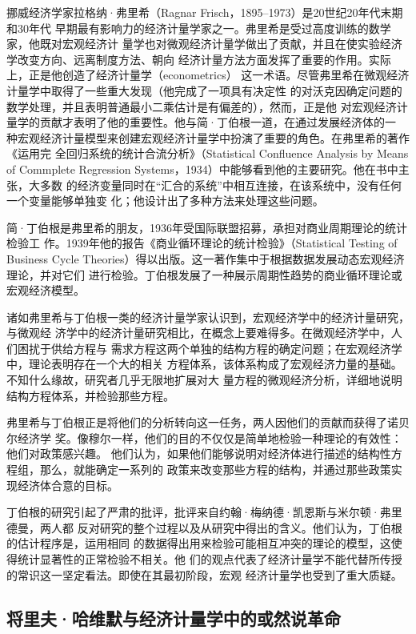 挪威经济学家拉格纳·弗里希（Ragnar Frisch，1895--1973）是20世纪20年代末期和30年代
早期最有影响力的经济计量学家之一。弗里希是受过高度训练的数学家，他既对宏观经济计
量学也对微观经济计量学做出了贡献，并且在使实验经济学改变方向、远离制度方法、朝向
经济计量方法方面发挥了重要的作用。实际上，正是他创造了经济计量学（econometrics）
这一术语。尽管弗里希在微观经济计量学中取得了一些重大发现（他完成了一项具有决定性
的对沃克因确定问题的数学处理，并且表明普通最小二乘估计是有偏差的），然而，正是他
对宏观经济计量学的贡献才表明了他的重要性。他与简·丁伯根一道，在通过发展经济体的一
种宏观经济计量模型来创建宏观经济计量学中扮演了重要的角色。在弗里希的著作《运用完
全回归系统的统计合流分析》（Statistical Confluence Analysis by Means of
Commplete Regression Systems，1934）中能够看到他的主要研究。他在书中主张，大多数
的经济变量同时在“汇合的系统”中相互连接，在该系统中，没有任何一个变量能够单独变
化；他设计出了多种方法来处理这些问题。

简·丁伯根是弗里希的朋友，1936年受国际联盟招募，承担对商业周期理论的统计检验工
作。1939年他的报告《商业循环理论的统计检验》（Statistical Testing of Business
Cycle Theories）得以出版。这一著作集中于根据数据发展动态宏观经济理论，并对它们
进行检验。丁伯根发展了一种展示周期性趋势的商业循环理论或宏观经济模型。

诸如弗里希与丁伯根一类的经济计量学家认识到，宏观经济学中的经济计量研究，与微观经
济学中的经济计量研究相比，在概念上要难得多。在微观经济学中，人们困扰于供给方程与
需求方程这两个单独的结构方程的确定问题；在宏观经济学中，理论表明存在一个大的相关
方程体系，该体系构成了宏观经济力量的基础。不知什么缘故，研究者几乎无限地扩展对大
量方程的微观经济分析，详细地说明结构方程体系，并检验那些方程。

弗里希与丁伯根正是将他们的分析转向这一任务，两人因他们的贡献而获得了诺贝尔经济学
奖。像穆尔一样，他们的目的不仅仅是简单地检验一种理论的有效性：他们对政策感兴趣。
他们认为，如果他们能够说明对经济体进行描述的结构性方程组，那么，就能确定一系列的
政策来改变那些方程的结构，并通过那些政策实现经济体合意的目标。

丁伯根的研究引起了严肃的批评，批评来自约翰·梅纳德·凯恩斯与米尔顿·弗里德曼，两人都
反对研究的整个过程以及从研究中得出的含义。他们认为，丁伯根的估计程序是，运用相同
的数据得出用来检验可能相互冲突的理论的模型，这使得统计显著性的正常检验不相关。他
们的观点代表了经济计量学不能代替所传授的常识这一坚定看法。即使在其最初阶段，宏观
经济计量学也受到了重大质疑。

\subsection{将里夫·哈维默与经济计量学中的或然说革命}

